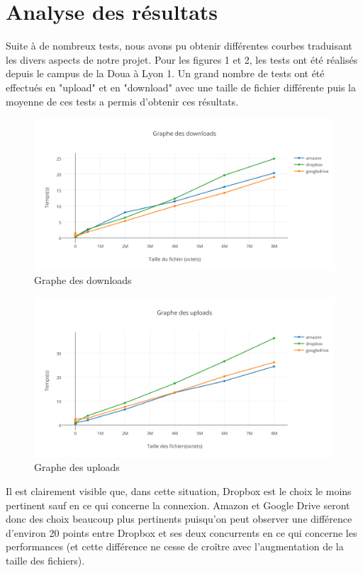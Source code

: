 \documentclass[10pt]{article}
\begin{document}
\section{Analyse des résultats}

Suite à de nombreux tests, nous avons pu obtenir différentes courbes
traduisant les divers aspects de notre projet. Pour les figures 1 et
2, les tests ont été réalisés depuis le campus de la Doua à Lyon 1. Un
grand nombre de tests ont été effectués en "upload" et en "download"
avec une taille de fichier différente puis la moyenne de ces tests a
permis d'obtenir ces résultats.

\begin{figure}[h]
\centering
\includegraphics[scale=0.7]{graphe_des_downloads.png}
\caption{Graphe des downloads}
\end{figure}

\newpage

\begin{figure}[h]
\centering
\includegraphics[scale=0.7]{graphe_des_uploads.png}
\caption{Graphe des uploads}
\end{figure}


Il est clairement visible que, dans cette situation, Dropbox est le
choix le moins pertinent sauf en ce qui concerne la connexion. Amazon
et Google Drive seront donc des choix beaucoup plus pertinents
puisqu'on peut observer une différence d'environ 20 points entre
Dropbox et ses deux concurrents en ce qui concerne les performances
(et cette différence ne cesse de croître avec l'augmentation de la
taille des fichiers).\\
\end{document}
